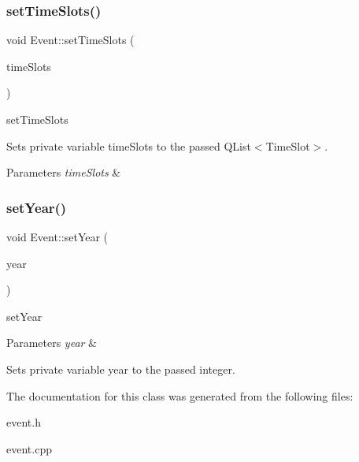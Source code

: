 \subsubsection{\texorpdfstring{set\+Time\+Slots()}{setTimeSlots()}}
{\footnotesize\ttfamily void Event\+::set\+Time\+Slots (\begin{DoxyParamCaption}\item[{Q\+List$<$ \hyperlink{class_time_slot}{Time\+Slot} $>$}]{time\+Slots }\end{DoxyParamCaption})}



set\+Time\+Slots 

Sets private variable time\+Slots to the passed Q\+List$<$\+Time\+Slot$>$. 
\begin{DoxyParams}{Parameters}
{\em time\+Slots} & \\
\hline
\end{DoxyParams}
\mbox{\label{class_event_adf16c1b8925ab210055ba0e3c05576d6}} 
\subsubsection{\texorpdfstring{set\+Year()}{setYear()}}
{\footnotesize\ttfamily void Event\+::set\+Year (\begin{DoxyParamCaption}\item[{int}]{year }\end{DoxyParamCaption})}



set\+Year 


\begin{DoxyParams}{Parameters}
{\em year} & \\
\hline
\end{DoxyParams}
Sets private variable year to the passed integer. 

The documentation for this class was generated from the following files\+:\begin{DoxyCompactItemize}
\item 
event.\+h\item 
event.\+cpp\end{DoxyCompactItemize}
